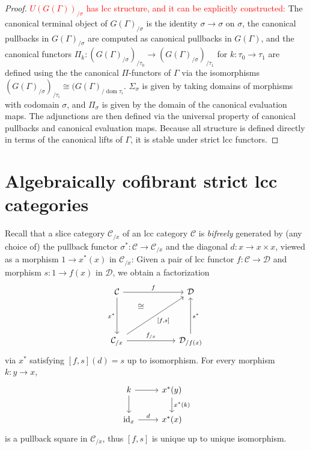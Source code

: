 \documentclass[a4paper]{article}
\newcommand{\todo}[1]{\textcolor{red}{#1}}
\theoremstyle{remark}
\theoremstyle{definition}
\begin{document}
\begin{proof}
  \todo{
    $U(G(\Gamma))_{/ \sigma}$ has lcc structure, and it can be explicitly constructed:
  }
  The canonical terminal object of $G(\Gamma)_{/ \sigma}$ is the identity $\sigma \rightarrow \sigma$ on $\sigma$, the canonical pullbacks in $G(\Gamma)_{/ \sigma}$ are computed as canonical pullbacks in $G(\Gamma)$, and the canonical functors $\Pi_k : (G(\Gamma)_{/ \sigma})_{/ \tau_0} \rightarrow (G(\Gamma)_{/ \sigma})_{/ \tau_1}$ for $k : \tau_0 \rightarrow \tau_1$ are defined using the the canonical $\Pi$-functors of $\Gamma$ via the isomorphisms $(G(\Gamma)_{/ \sigma})_{/ \tau_i} \cong (G(\Gamma)_{/ \operatorname{dom} \tau_i}$.
  $\Sigma_\sigma$ is given by taking domains of morphisms with codomain $\sigma$, and $\Pi_\sigma$ is given by the domain of the canonical evaluation maps.
  The adjunctions are then defined via the universal property of canonical pullbacks and canonical evaluation maps.
  Because all structure is defined directly in terms of the canonical lifts of $\Gamma$, it is stable under strict lcc functors.
\end{proof}

\section{Algebraically cofibrant strict lcc categories}
\label{sec:algebraically-cofibrant}

Recall that a slice category $\mathcal{C}_{/ x}$ of an lcc category $\mathcal{C}$ is \emph{bifreely} generated by (any choice of) the pullback functor $\sigma^* : \mathcal{C} \rightarrow \mathcal{C}_{/ x}$ and the diagonal $d : x \rightarrow x \times x$, viewed as a morphism $1 \rightarrow x^*(x)$ in $\mathcal{C}_{/ x}$:
Given a pair of lcc functor $f : \mathcal{C} \rightarrow \mathcal{D}$ and morphism $s : 1 \rightarrow f(x)$ in $\mathcal{D}$, we obtain a factorization
\begin{equation}
  \begin{tikzcd}
    \mathcal{C} \arrow[rr, "f"] \arrow[dd, "x^*"'] & \, & \mathcal{D} \\
    & & \, \\
    \mathcal{C}_{/ x} \arrow[rr, "f_{/ x}"] \arrow[uur, phantom, "\cong", near end] \arrow[uurr, "{[f, s]}"'] & & \mathcal{D}_{/ f(x)} \arrow[uu, "s^*"']
  \end{tikzcd}
\end{equation}
via $x^*$ satisfying $[f, s](d) = s$ up to isomorphism.
For every morphism $k : y \rightarrow x$,
\begin{equation}
  \begin{tikzcd}
    k \arrow[r] \arrow[d] & x^*(y) \arrow[d, "x^*(k)"] \\
    \mathrm{id}_x \arrow[r, "d"] & x^*(x)
  \end{tikzcd}
\end{equation}
is a pullback square in $\mathcal{C}_{/ x}$, thus $[f, s]$ is unique up to unique isomorphism.
\end{document}
